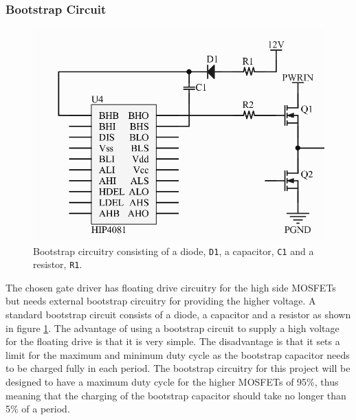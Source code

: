\subsubsection{Bootstrap Circuit}
\label{ssub:bootstrap_circuit}
\begin{figure}[h]
	\centering
	\includegraphics[width=0.6\linewidth]{graphics/hip_bootstrap}
	\caption[Bootstrap circuitry]{Bootstrap circuitry consisting of a diode, \texttt{D1}, a capacitor, \texttt{C1} and a resistor, \texttt{R1}. }
	\label{fig:hip_bootstrap}
\end{figure}	
The chosen gate driver has floating drive circuitry for the high side MOSFETs but needs external bootstrap circuitry for providing the higher voltage. 
A standard bootstrap circuit consists of a diode, a capacitor and a resistor as shown in figure \ref{fig:hip_bootstrap}.
The advantage of using a bootstrap circuit to supply a high voltage for the floating drive is that it is very simple. 
The disadvantage is that it sets a limit for the maximum and minimum duty cycle as the bootstrap capacitor needs to be charged fully in each period.
The bootstrap circuitry for this project will be designed to have a maximum duty cycle for the higher MOSFETs of 95\%, thus meaning that the charging of the bootstrap capacitor should take no longer than 5\% of a period.  

